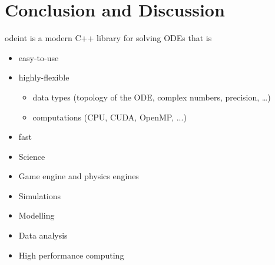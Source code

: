 \section{Conclusion and Discussion}

\begin{frame}
  \tableofcontents[currentsection] 
\end{frame}


\begin{frame}[fragile]

\vspace{2ex}

odeint is a modern C++ library for solving ODEs that is

\begin{itemize}
 \item easy-to-use
 \item highly-flexible
 \begin{itemize}
  \item data types (topology of the ODE, complex numbers, precision, \dots)
  \item computations (CPU, CUDA, OpenMP, ...)
 \end{itemize}
 \item fast
\end{itemize}





\end{frame}



\begin{frame}

 \vspace{2ex}

 \begin{itemize}
  \item Science
  \item Game engine and physics engines
  \item Simulations
  \item Modelling
  \item Data analysis
  \item High performance computing
 \end{itemize}

\end{frame}



